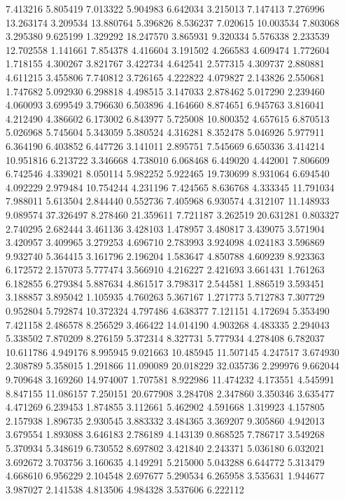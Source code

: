7.413216
5.805419
7.013322
5.904983
6.642034
3.215013
7.147413
7.276996
13.263174
3.209534
13.880764
5.396826
8.536237
7.020615
10.003534
7.803068
3.295380
9.625199
1.329292
18.247570
3.865931
9.320334
5.576338
2.233539
12.702558
1.141661
7.854378
4.416604
3.191502
4.266583
4.609474
1.772604
1.718155
4.300267
3.821767
3.422734
4.642541
2.577315
4.309737
2.880881
4.611215
3.455806
7.740812
3.726165
4.222822
4.079827
2.143826
2.550681
1.747682
5.092930
6.298818
4.498515
3.147033
2.878462
5.017290
2.239460
4.060093
3.699549
3.796630
6.503896
4.164660
8.874651
6.945763
3.816041
4.212490
4.386602
6.173002
6.843977
5.725008
10.800352
4.657615
6.870513
5.026968
5.745604
5.343059
5.380524
4.316281
8.352478
5.046926
5.977911
6.364190
6.403852
6.447726
3.141011
2.895751
7.545669
6.650336
3.414214
10.951816
6.213722
3.346668
4.738010
6.068468
6.449020
4.442001
7.806609
6.742546
4.339021
8.050114
5.982252
5.922465
19.730699
8.931064
6.694540
4.092229
2.979484
10.754244
4.231196
7.424565
8.636768
4.333345
11.791034
7.988011
5.613504
2.844440
0.552736
7.405968
6.930574
4.312107
11.148933
9.089574
37.326497
8.278460
21.359611
7.721187
3.262519
20.631281
0.803327
2.740295
2.682444
3.461136
3.428103
1.478957
3.480817
3.439075
3.571904
3.420957
3.409965
3.279253
4.696710
2.783993
3.924098
4.024183
3.596869
9.932740
5.364415
3.161796
2.196204
1.583647
4.850788
4.609239
8.923363
6.172572
2.157073
5.777474
3.566910
4.216227
2.421693
3.661431
1.761263
6.182855
6.279384
5.887634
4.861517
3.798317
2.544581
1.886519
3.593451
3.188857
3.895042
1.105935
4.760263
5.367167
1.271773
5.712783
7.307729
0.952804
5.792874
10.372324
4.797486
4.638377
7.121151
4.172694
5.353490
7.421158
2.486578
8.256529
3.466422
14.014190
4.903268
4.483335
2.294043
5.338502
7.870209
8.276159
5.372314
8.327731
5.777934
4.278408
6.782037
10.611786
4.949176
8.995945
9.021663
10.485945
11.507145
4.247517
3.674930
2.308789
5.358015
1.291866
11.090089
20.018229
32.035736
2.299976
9.662044
9.709648
3.169260
14.974007
1.707581
8.922986
11.474232
4.173551
4.545991
8.847155
11.086157
7.250151
20.677908
3.284708
2.347860
3.350346
3.635477
4.471269
6.239453
1.874855
3.112661
5.462902
4.591668
1.319923
4.157805
2.157938
1.896735
2.930545
3.883332
3.484365
3.369207
9.305860
4.942013
3.679554
1.893088
3.646183
2.786189
4.143139
0.868525
7.786717
3.549268
5.370934
5.348619
6.730552
8.697802
3.421840
2.243371
5.036180
6.032021
3.692672
3.703756
3.160635
4.149291
5.215000
5.043288
6.644772
5.313479
4.668610
6.956229
2.104548
2.697677
5.290534
6.265958
3.535631
1.944677
3.987027
2.141538
4.813506
4.984328
3.537606
6.222112

